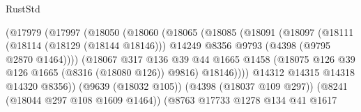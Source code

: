 \begin{lexlean}{RustStd}
\begin{coremodule}
                                        (@17979
                                          (@17997
                                            (@18050
                                              (@18060
                                                (@18065
                                                  (@18085
                                                    (@18091
                                                      (@18097
                                                        (@18111
                                                          (@18114 (@18129 (@18144 @18146)))
                                                          @14249
                                                          @8356
                                                          @9793
                                                          (@4398 (@9795 @2870 @1464))))
                                                      (@18067
                                                        @317
                                                        @136
                                                        @39
                                                        @44
                                                        @1665
                                                        @1458
                                                        (@18075
                                                          @126
                                                          @39
                                                          @126
                                                          @1665
                                                          (@8316 (@18080 @126))
                                                          @9816)
                                                        @18146))))
                                                @14312
                                                @14315
                                                @14318
                                                @14320
                                                @8356))
                                            (@9639 (@18032 @105))
                                            (@4398 (@18037 @109 @297))
                                            (@8241 (@18044 @297 @108 @1609 @1464))
                                            (@8763
                                              @17733
                                              @1278
                                              @134
                                              @41
                                              @1617

\end{coremodule}
\end{lexlean}
